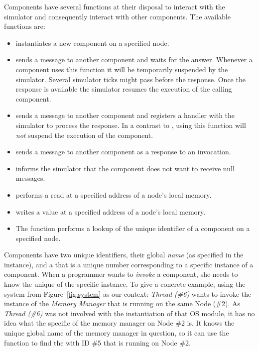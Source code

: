 Components have several functions at their disposal to interact with the simulator and consequently interact with other components.
The available functions are:
\begin{itemize}
\item {}
instantiates a new component on a specified node.
\item {}
sends a message to another component and waits for the answer.
Whenever a component uses this function it will be temporarily suspended by the simulator.
Several simulator ticks might pass before the response.
Once the response is available the simulator resumes the execution of the calling component.
\item {}
sends a message to another component and registers a handler with the simulator to process the response.
In a contrast to , using this function will \emph{not} suspend the execution of the component.
\item {}
sends a message to another component as a response to an invocation.
\item {}
informs the simulator that the component does not want to receive null messages.
\item {}
performs a read at a specified address of a node's local memory.
\item {}
writes a value at a specified address of a node's local memory.
\item The function {}
performs a lookup of the unique identifier of a component on a specified node.
\end{itemize}
Components have two unique identifiers, their global \emph{name} (as specified in the  instance), and a  that is a unique number corresponding to a specific instance of a component.
When a programmer wants to \emph{invoke} a component, she needs to know the unique \mbox{} of the specific instance.
To give a concrete example, using the system from Figure~\ref{fig:system} as our context: \emph{Thread (\#6)} wants to invoke the instance of the \emph{Memory Manager} that is running on the same Node (\#2).
As \emph{Thread (\#6)} was not involved with the instantiation of that OS module, it has no idea what the specific  of the memory manager on Node \#2 is.
It knows the unique global name of the memory manager in question, so it can use the  function to find the  with ID \#5 that is running on Node \#2.

